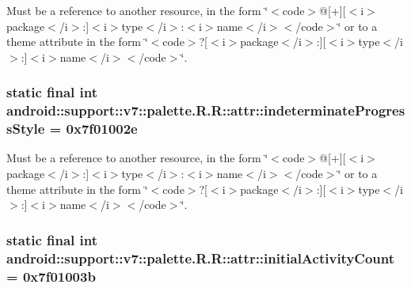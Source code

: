 Must be a reference to another resource, in the form \char`\"{}$<$code$>$@\mbox{[}+\mbox{]}\mbox{[}$<$i$>$package$<$/i$>$:\mbox{]}$<$i$>$type$<$/i$>$:$<$i$>$name$<$/i$>$$<$/code$>$\char`\"{} or to a theme attribute in the form \char`\"{}$<$code$>$?\mbox{[}$<$i$>$package$<$/i$>$:\mbox{]}\mbox{[}$<$i$>$type$<$/i$>$:\mbox{]}$<$i$>$name$<$/i$>$$<$/code$>$\char`\"{}. \hypertarget{classandroid_1_1support_1_1v7_1_1palette_1_1_r_1_1attr_d5085b315aa4253052092f5a2d220f21}{
\subsubsection[{indeterminateProgressStyle}]{\setlength{\rightskip}{0pt plus 5cm}static final int android::support::v7::palette.R.R::attr::indeterminateProgressStyle = 0x7f01002e}}
\label{classandroid_1_1support_1_1v7_1_1palette_1_1_r_1_1attr_d5085b315aa4253052092f5a2d220f21}


Must be a reference to another resource, in the form \char`\"{}$<$code$>$@\mbox{[}+\mbox{]}\mbox{[}$<$i$>$package$<$/i$>$:\mbox{]}$<$i$>$type$<$/i$>$:$<$i$>$name$<$/i$>$$<$/code$>$\char`\"{} or to a theme attribute in the form \char`\"{}$<$code$>$?\mbox{[}$<$i$>$package$<$/i$>$:\mbox{]}\mbox{[}$<$i$>$type$<$/i$>$:\mbox{]}$<$i$>$name$<$/i$>$$<$/code$>$\char`\"{}. \hypertarget{classandroid_1_1support_1_1v7_1_1palette_1_1_r_1_1attr_ca5e08ab1839fac5ba8be640d29c8369}{
\subsubsection[{initialActivityCount}]{\setlength{\rightskip}{0pt plus 5cm}static final int android::support::v7::palette.R.R::attr::initialActivityCount = 0x7f01003b}}
\label{classandroid_1_1support_1_1v7_1_1palette_1_1_r_1_1attr_ca5e08ab1839fac5ba8be640d29c8369}


